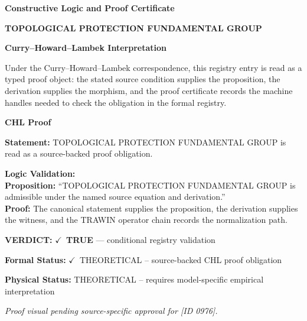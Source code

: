 \clearpage
\begingroup\tzpsupportsetup
\noindent\textbf{\fontsize{10.8pt}{12.8pt}\selectfont [ID 0976] Constructive Logic and Proof Certificate}\par
\noindent\textbf{\fontsize{10pt}{12pt}\selectfont TOPOLOGICAL PROTECTION FUNDAMENTAL GROUP}\par
\vspace{0.45em}
\begingroup
\footnotesize
\setlength{\parskip}{0.22em}
\setlength{\parindent}{0pt}
\noindent\textbf{Curry--Howard--Lambek Interpretation}\par
Under the Curry--Howard--Lambek correspondence, this registry entry is read as a typed proof
object: the stated source condition supplies the proposition, the derivation supplies the
morphism, and the proof certificate records the machine handles needed to check the obligation
in the formal registry.

\vspace{0.45em}
\noindent\textbf{CHL Proof}\par
\textbf{Statement:} TOPOLOGICAL PROTECTION FUNDAMENTAL GROUP is read as a source-backed proof obligation.

\textbf{Logic Validation:}\\
\textbf{Proposition:} ``TOPOLOGICAL PROTECTION FUNDAMENTAL GROUP is admissible under the named source equation and derivation.''\\
\textbf{Proof:} The canonical statement supplies the proposition, the derivation supplies the witness, and the TRAWIN operator chain records the normalization path.

\textbf{VERDICT:} \ensuremath{\checkmark}\ \textbf{TRUE} --- conditional registry validation

\textbf{Formal Status:} \ensuremath{\checkmark}\ THEORETICAL -- source-backed CHL proof obligation

\textbf{Physical Status:} THEORETICAL -- requires model-specific empirical interpretation
\par\vspace{0.45em}
\par
\vfill
\begingroup\footnotesize\itshape
Proof visual pending source-specific approval for [ID 0976].
\par\endgroup
\vfill
\endgroup
\endgroup
